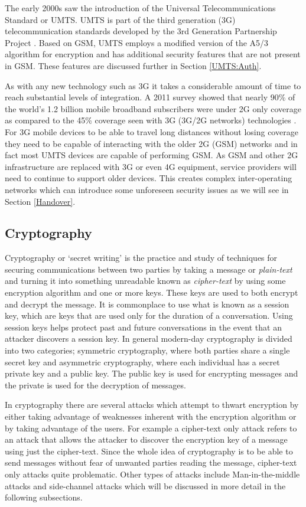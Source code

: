 \documentclass{sig-alternate}
\begin{document}
The early 2000s saw the introduction of the Universal Telecommunications Standard or UMTS. UMTS is part of the third generation (3G) telecommunication standards developed by the 3rd Generation Partnership Project \cite{wiki:UMTS}. Based on GSM, UMTS employs a modified version of the A5/3 algorithm for encryption and has additional security features  that are not present in GSM. These features are discussed further in Section \ref{UMTS:Auth}. 

 As with any new technology such as 3G it takes a considerable amount of time to reach substantial levels of integration. A 2011 survey showed that nearly 90\% of the world's 1.2 billion mobile broadband subscribers were under 2G only coverage as compared to the 45\% coverage seen with 3G (3G/2G networks) technologies \cite{2G-coverage}. For 3G mobile devices to be able to travel long distances without losing coverage they need to be capable of interacting with the older 2G (GSM) networks and in fact most UMTS devices are capable of performing GSM. As GSM and other 2G infrastructure are replaced with 3G or even 4G equipment, service providers will need to continue to support older devices. This creates complex inter-operating networks which can introduce some unforeseen security issues as we will see in Section \ref{Handover}.

	\subsection{Cryptography \label{crypto}}
	Cryptography or  `secret writing' is the practice and study of techniques for securing communications between two parties by taking a message or \textit{plain-text} and turning it into something  unreadable known as \textit{cipher-text} by using some encryption algorithm and one or more keys. These keys are used to both encrypt and decrypt the message. It is commonplace to use what is known as a session key, which are keys that are used only for the duration of a conversation. Using session keys helps protect past and future conversations in the event that an attacker discovers a session key. In general modern-day cryptography is divided into two categories; symmetric cryptography, where both parties share a single secret key and asymmetric cryptography, where each individual has a secret private key and a public key. The public key is used for encrypting messages and the private is used for the decryption of messages.
	
	In cryptography there are several attacks which attempt to thwart encryption by either taking advantage of weaknesses inherent with the encryption algorithm or by taking advantage of the users. For example a cipher-text only attack refers to an attack that allows the attacker to discover the encryption key of a message using just the cipher-text. Since the whole idea of cryptography is to be able to send messages without fear of unwanted parties reading the message, cipher-text only attacks quite problematic. Other types of attacks include Man-in-the-middle attacks and side-channel attacks which will be discussed in more detail in the following subsections.   
\end{document}

